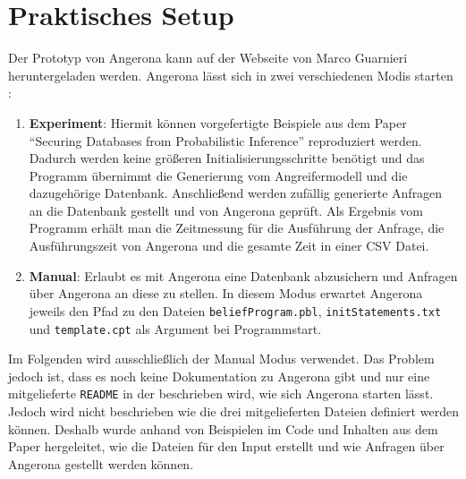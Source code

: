 \documentclass[german,version-2020-11]{uzl-thesis}
\begin{document}
\section{Praktisches Setup} \label{2.2}
Der Prototyp von Angerona kann auf der Webseite von Marco Guarnieri \cite{6} heruntergeladen werden. Angerona lässt sich in zwei verschiedenen Modis starten :
\begin{enumerate}
	\item \textbf{Experiment}: Hiermit können vorgefertigte Beispiele aus dem Paper \enquote{Securing Databases from Probabilistic Inference} \cite{guarnieri2017securing} reproduziert werden. Dadurch werden keine größeren Initialisierungsschritte benötigt und das Programm übernimmt die Generierung vom Angreifermodell und die dazugehörige Datenbank. Anschließend werden zufällig generierte Anfragen an die Datenbank gestellt und von Angerona geprüft. Als Ergebnis vom Programm erhält man die Zeitmessung für die Ausführung der Anfrage, die Ausführungszeit von Angerona und die gesamte Zeit in einer CSV Datei.
	\item \textbf{Manual}: Erlaubt es mit Angerona eine Datenbank abzusichern und Anfragen über Angerona an diese zu stellen.
	In diesem Modus erwartet Angerona jeweils den Pfad zu den Dateien \texttt{beliefProgram.pbl}, \texttt{initStatements.txt} und \texttt{template.cpt} als Argument bei Programmstart.
\end{enumerate}
Im Folgenden wird ausschließlich der Manual Modus verwendet. Das Problem jedoch ist, dass es noch keine Dokumentation zu Angerona gibt und nur eine mitgelieferte \texttt{README} in der beschrieben wird, wie sich Angerona starten lässt. Jedoch wird nicht beschrieben wie die drei mitgelieferten Dateien definiert werden können. Deshalb wurde anhand von Beispielen im Code und Inhalten aus dem Paper hergeleitet, wie die Dateien für den Input erstellt und wie Anfragen über Angerona gestellt werden können.
\end{document}
